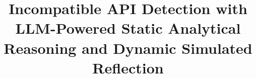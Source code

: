 \documentclass[screen]{IEEEtran}
\theoremstyle{acmdefinition}
\begin{document}
\title{Incompatible API Detection with LLM-Powered Static Analytical Reasoning and Dynamic Simulated Reflection}



\maketitle


\begin{abstract}

\end{abstract}










{\footnotesize


}
\end{document}
